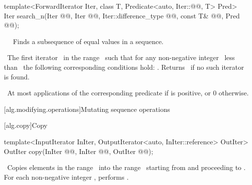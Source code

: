 \documentclass[american,twoside]{book}
\begin{document}
\begin{paras}
\begin{itemdecl}
template<ForwardIterator Iter, class T,
         Predicate<auto, Iter::@@, T> Pred>
  Iter search_n(Iter @@, Iter @@, Iter::difference_type @@,
                const T& @@, Pred @@);
\end{itemdecl}\color{black}

\begin{itemdescr}
\pnum
{} 


\pnum\ \color{black}
\effects\ 
Finds a subsequence of equal values in a sequence.

\pnum
\returns\ 
The first iterator
\
in the range \
such that for any non-negative integer
\tcode{n}\
less than
\
the following corresponding conditions hold:
.
Returns \farg{last}\
if no such iterator is found.

\pnum
\textcolor{black}{}\complexity\ 
At most
applications of the corresponding predicate if \farg{count} is positive, or
0 otherwise.
\end{itemdescr}

\rSec1[alg.modifying.operations]{Mutating sequence operations}

\rSec2[alg.copy]{Copy}

\index{copy@\tcode{copy}}%
\color{addclr}\begin{itemdecl}
template<InputIterator InIter, OutputIterator<auto, InIter::reference> OutIter>
  OutIter copy(InIter @@, InIter @@,
               OutIter @\farg{result}@);
\end{itemdecl}\color{black}

\begin{itemdescr}
\pnum
\effects\ 
Copies elements in the range \
into the range \
starting from  and proceeding to .
For each non-negative integer
\tcode{n < (\farg{last}-\farg{first})},
performs
.


\end{itemdescr}
\end{paras}
\end{document}
